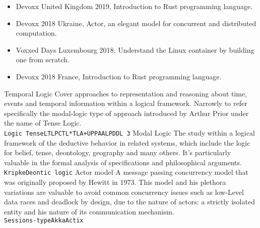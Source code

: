 \documentclass[9pt]{developercv}
\begin{document}

\begin{itemize}
	\item Devoxx United Kingdom 2019, Introduction to Rust programming language.
	\item Devoxx 2018 Ukraine, Actor, an elegant model for concurrent and distributed computation.
	\item Voxxed Days Luxembourg 2018, Understand the Linux container by building one from scratch.
	\item Devoxx 2018 France, Introduction to Rust programming language.
\end{itemize}


\begin{entrylist}
	\entry
	{}
	{Temporal Logic}
	{}
	{
		Cover approaches to representation and reasoning about time, events and temporal information within a
		logical framework. Narrowly to refer specifically the modal-logic type of approach introduced by Arthur
		Prior under the name of Tense Logic.\\
		\texttt{Logic Tense}\slashsep\texttt{LTLP}\slashsep\texttt{CTL*}\slashsep\texttt{TLA+}\slashsep\texttt{UPPAAL}\slashsep\texttt{PDDL 3}
	}
	\entry
	{}
	{Modal Logic}
	{}
	{
		The study within a logical framework of the deductive behavior in related systems, which include the
		logic for belief, tense, deontology, geography and many others. It’s particularly valuable in the formal
		analysis of specifications and philosophical arguments.\\
		\texttt{Kripke}\slashsep\texttt{Deontic logic}
	}
	\entry
	{}
	{Actor model}
	{}
	{
		A message passing concurrency model that was originally proposed by Hewitt in 1973. This model and
		his plethora variations are valuable to avoid common concurrency issues such as low-Level data races
		and deadlock by design, due to the nature of actors: a strictly isolated entity and his nature of its
		communication mechanism.\\
		\texttt{Sessions-type}\slashsep\texttt{Akka}\slashsep\texttt{Actix}
	}
\end{entrylist}
\end{document}
